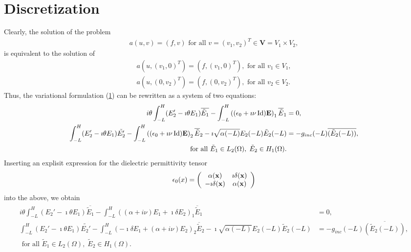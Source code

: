 \documentclass[proc]{edpsmath}
\newcommand{\be}{\begin{equation}}
\newcommand{\ee}{\end{equation}}
\newcommand{\x}{{\bf x}}
\newcommand{\E}{{\bf E}}
\begin{document}
\section{Discretization}
Clearly, the solution of the problem 
\begin{align*}
a(u, v)=(f,v)\text{ for all } v=(v_{1},v_{2})^{T}\in \mathbf{V}=V_1\times V_2, 
\end{align*}
is equivalent to the solution of
\begin{align*}
a(u,(v_{1},0)^{T})=(f,(v_{1},0)^{T}),\text{ for all } v_1\in V_1,\\
a(u,(0,v_{2})^{T})=(f,(0,v_{2})^{T}),\text{ for all } v_2\in V_2.
\end{align*}
Thus, the variational formulation (\ref{}) can be rewritten as a system of two equations:
\begin{align*}
\begin{split}
i\theta \displaystyle \int_{-L}^H (E_2' -\imath\theta E_1)\overline{\tilde E_1} - \int_{-L}^H \left((\epsilon_0 +\imath\nu \operatorname{Id}) \E\right)_{1} \overline{\tilde E}_{1}
&=0,\\
\displaystyle \int_{-L}^H (E_2' -\imath\theta E_1)\tilde {E_2'} - \int_{-L}^H\left( (\epsilon_0 +\imath\nu\operatorname{Id}) \E\right)_{2}\overline{\tilde{E}}_{2}
  - \imath \sqrt{\alpha(-L)} E_2 (-L) \tilde E_2 (-L) &= -g_{inc} (-L) \overline{( \tilde E_2(-L) )},\\
  \text{ for all } \tilde E_{1}\in L_{2}(\Omega), \; \tilde{E}_{2}\in H_{1}(\Omega).
  \end{split}
\end{align*}
Inserting an explisit expression for the dielectric permittivity tensor 
\be \label{eq:epsilonmu}
 \epsilon_0(x) =
\left(
\begin{array}{cc}
\alpha(\x) & \imath \delta (\x)\\
-\imath \delta (\x) & \alpha(\x)
\end{array}
\right)
\ee
into the above, we obtain
\begin{align}
\label{eq:var_form2}
\begin{split}
 i\theta \displaystyle \int_{-L}^H (E_2' -\imath\theta E_1)\overline{\tilde E_1} - 
 \int_{-L}^H \left((\alpha+i\nu)E_1+\imath\delta E_2\right)_{1} \overline{\tilde E}_{1}
&=0,\\
\int_{-L}^H (E_2' -\imath\theta E_1)\tilde {E_2'} -
\int_{-L}^H\left( -\imath \delta E_1+(\alpha+i\nu) E_2\right)_{2}\overline{\tilde{E}}_{2}
  - \imath \sqrt{\alpha(-L)} E_2 (-L) \tilde E_2 (-L) &= -g_{inc} (-L) \overline{( \tilde E_2(-L) )},\\
  \text{ for all } \tilde E_{1}\in L_{2}(\Omega), \; \tilde{E}_{2}\in H_{1}(\Omega).
  \end{split}
\end{align}
\end{document}
